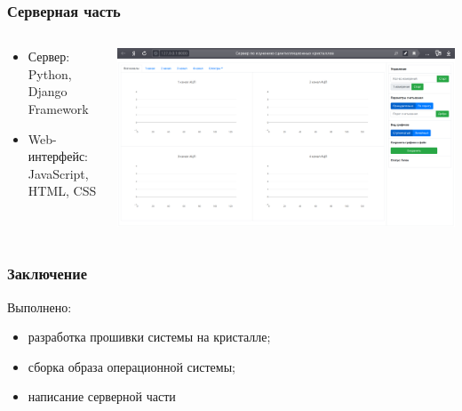 \documentclass[aspectratio=169]{beamer}
\begin{document}
\begin{frame}
\frametitle{Серверная часть}
    \begin{columns}
        \begin{column}{0.25\textwidth}
            \begin{itemize}
                \item Сервер: Python, Django Framework
                \item Web-интерфейс: JavaScript, HTML, CSS
            \end{itemize}
        \end{column}
        \begin{column}{0.75\textwidth}
            \includegraphics[width=\textwidth]{server.jpg}
        \end{column}
    \end{columns}
\end{frame}

\begin{frame}
\frametitle{Заключение}
    Выполнено:
    \begin{itemize}
        \item разработка прошивки системы на кристалле;
        \item сборка образа операционной системы;
        \item написание серверной части
    \end{itemize}
\end{frame}
\end{document}
